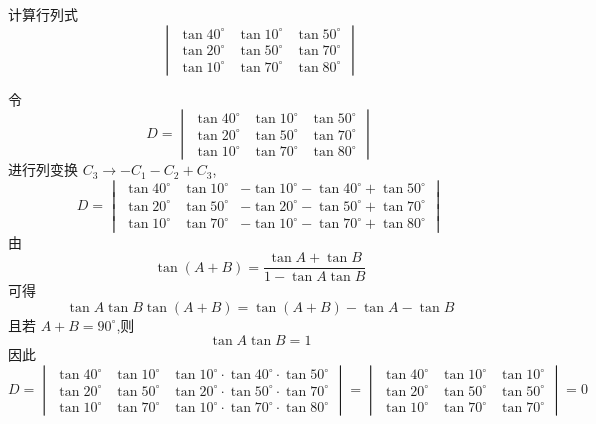 \begin{questions}
    \question 计算行列式
    \[
    \begin{vmatrix}
    \tan 40^{\circ} & \tan 10^{\circ} & \tan 50^{\circ} \\
    \tan 20^{\circ} & \tan 50^{\circ} & \tan 70^{\circ} \\
    \tan 10^{\circ} & \tan 70^{\circ} & \tan 80^{\circ}
    \end{vmatrix}
    \]
    \begin{solution}
        令
        \[
        D=
        \begin{vmatrix}
        \tan 40^\circ & \tan 10^\circ & \tan 50^\circ \\
        \tan 20^\circ & \tan 50^\circ & \tan 70^\circ \\
        \tan 10^\circ & \tan 70^\circ & \tan 80^\circ
        \end{vmatrix}
        \]
        进行列变换 $C_3 \to -C_1 - C_2 + C_3 $,
        \[
        D=
        \begin{vmatrix}
        \tan 40^\circ & \tan 10^\circ & -\tan 10^\circ - \tan 40^\circ + \tan 50^\circ \\
        \tan 20^\circ & \tan 50^\circ & -\tan 20^\circ - \tan 50^\circ + \tan 70^\circ \\
        \tan 10^\circ & \tan 70^\circ & -\tan 10^\circ - \tan 70^\circ + \tan 80^\circ
        \end{vmatrix}
        \]
        由
        \[
        \tan(A+B) = \frac{\tan A + \tan B}{1 - \tan A \tan B} 
        \]
        可得
        \[
        \tan A \tan B \tan (A+B) = \tan(A+B) - \tan A - \tan B
        \]
        且若 $A + B = 90^\circ$,则 
        \[
        \tan A \tan B = 1
        \]
        因此
        \[
        D=\begin{vmatrix}
        \tan 40^\circ & \tan 10^\circ & \tan 10^\circ \cdot \tan 40^\circ \cdot \tan 50^\circ \\
        \tan 20^\circ & \tan 50^\circ & \tan 20^\circ \cdot \tan 50^\circ \cdot \tan 70^\circ \\
        \tan 10^\circ & \tan 70^\circ & \tan 10^\circ \cdot \tan 70^\circ \cdot \tan 80^\circ
        \end{vmatrix}
        =
        \begin{vmatrix}
        \tan 40^\circ & \tan 10^\circ & \tan 10^\circ \\
        \tan 20^\circ & \tan 50^\circ & \tan 50^\circ \\
        \tan 10^\circ & \tan 70^\circ & \tan 70^\circ
        \end{vmatrix}
        =0
        \]
    \end{solution}


\end{questions}
